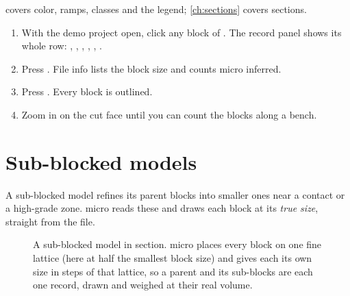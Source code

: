  covers color, ramps, classes and the legend; \cref{ch:sections} covers sections.

\begin{tryit}
\begin{enumerate}
\item With the demo project open, click any block of . The record panel shows its whole row: , , , , , .
\item Press . File info lists the block size and counts micro inferred.
\item Press . Every block is outlined.
\item Zoom in on the cut face until you can count the blocks along a bench.
\end{enumerate}
\end{tryit}

\section{Sub-blocked models}\label{sec:blocks-sub}

A sub-blocked model refines its parent blocks into smaller ones near a contact or a high-grade zone. micro reads these and draws each block at its \emph{true size}, straight from the file.

\begin{figure}[htbp]\centering
{}
\caption{A sub-blocked model in section. micro places every block on one fine lattice (here at half the smallest block size) and gives each its own size in steps of that lattice, so a parent and its sub-blocks are each one record, drawn and weighed at their real volume.}\label{fig:blocks-subblocks}
\end{figure}

